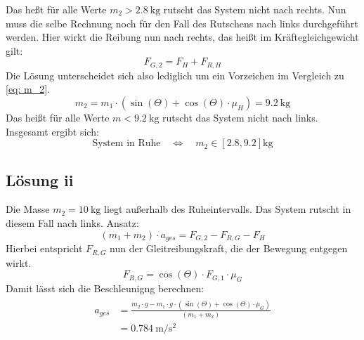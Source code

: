 Das heßt für alle Werte $m_2 > \SI{2.8}{\kilo\gram}$ rutscht das System nicht nach rechts. Nun muss die selbe Rechnung noch für den Fall des Rutschens nach
links durchgeführt werden. Hier wirkt die Reibung nun nach rechts, das heißt im Kräftegleichgewicht gilt:
\begin{equation}
  F_{G,2}  = F_H + F_{R,H}
\end{equation}
Die Lösung unterscheidet sich also lediglich um ein Vorzeichen im Vergleich zu \eqref{eq: m_2}.
\begin{equation}
  m_2 = m_1 \cdot (\sin\left(\Theta\right) + \cos\left(\Theta\right)  \cdot \mu_H) = \SI{9.2}{\kilo\gram}
\end{equation}
Das heißt für alle Werte $m < \SI{9.2}{\kilo\gram}$ rutscht das System nicht nach links. Insgesamt ergibt sich:
\begin{equation}
  \text{System in Ruhe} \quad \Leftrightarrow \quad m_2 \in [2.8,9.2]\si{\kilo\gram}
\end{equation}
\subsection{Lösung ii}
Die Masse $m_2 = \SI{10}{\kilo\gram}$ liegt außerhalb des Ruheintervalls. Das System rutscht in diesem Fall nach links. Ansatz:
\begin{equation}
  (m_1 + m_2) \cdot a_{ges} = F_{G,2} - F_{R, G} - F_H
\end{equation}
Hierbei entspricht $F_{R, G}$ nun der Gleitreibungskraft, die der Bewegung entgegen wirkt.
\begin{equation}
  F_{R, G} = \cos\left(\Theta\right) \cdot F_{G,1} \cdot \mu_G
\end{equation}
Damit lässt sich die Beschleunigng berechnen:
\begin{align}
  \begin{aligned}
    a_{ges} &= \frac{m_2 \cdot g - m_1 \cdot g\cdot(\sin\left(\Theta\right) + \cos\left(\Theta\right)\cdot \mu_G)}{(m_1 + m_2)} \\
            &= \SI{0.784}{\meter\per\second^2}
\end{aligned}
\end{align}


\newpage
